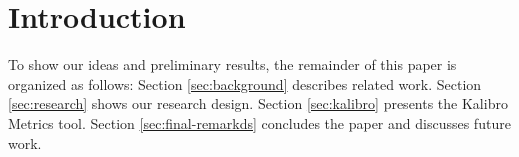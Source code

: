 \section{Introduction}
\label{introduction}


To show our ideas and preliminary results, the remainder of this
paper is organized as follows:
%
Section \ref{sec:background} describes related work.
%
Section \ref{sec:research} shows our research design.
%
Section \ref{sec:kalibro} presents the Kalibro Metrics tool.
%
Section \ref{sec:final-remarkds} concludes the paper and discusses
future work.



